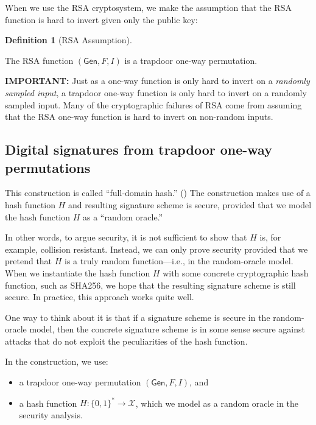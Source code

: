 \documentclass[
  letterpaper,
]{scrbook}
\providecommand{\tightlist}{%
  \setlength{\itemsep}{0pt}\setlength{\parskip}{0pt}}
\newcommand{\zo}{\{0,1\}}
\newcommand{\calX}{\mathcal{X}}
\newcommand{\Gen}{\mathsf{Gen}}
\theoremstyle{definition}
\newtheorem{definition}{Definition}[chapter]
\theoremstyle{plain}
\theoremstyle{plain}
\theoremstyle{remark}
\begin{document}
When we use the RSA cryptosystem, we make the assumption that the RSA
function is hard to invert given only the public key:

\begin{definition}[RSA
Assumption]\protect\hypertarget{def-rsa-assumption}{}\label{def-rsa-assumption}

The RSA function \((\Gen, F, I)\) is a trapdoor one-way permutation.

\end{definition}

\textbf{IMPORTANT:} Just as a one-way function is only hard to invert on
a \emph{randomly sampled input}, a trapdoor one-way function is only
hard to invert on a randomly sampled input. Many of the cryptographic
failures of RSA come from assuming that the RSA one-way function is hard
to invert on non-random inputs.

\subsection{Digital signatures from trapdoor one-way
permutations}\label{digital-signatures-from-trapdoor-one-way-permutations}

This construction is called ``full-domain hash.''
() The construction makes
use of a hash function \(H\) and resulting signature scheme is secure,
provided that we model the hash function \(H\) as a ``random oracle.''

In other words, to argue security, it is not sufficient to show that
\(H\) is, for example, collision resistant. Instead, we can only prove
security provided that we pretend that \(H\) is a truly random
function---i.e., in the random-oracle model. When we instantiate the
hash function \(H\) with some concrete cryptographic hash function, such
as SHA256, we hope that the resulting signature scheme is still secure.
In practice, this approach works quite well.

One way to think about it is that if a signature scheme is secure in the
random-oracle model, then the concrete signature scheme is in some sense
secure against attacks that do not exploit the peculiarities of the hash
function.

In the construction, we use:

\begin{itemize}
\tightlist
\item
  a trapdoor one-way permutation \((\Gen, F, I)\), and
\item
  a hash function \(H \colon \zo^* \to \calX\), which we model as a
  random oracle in the security analysis.
\end{itemize}
\end{document}
